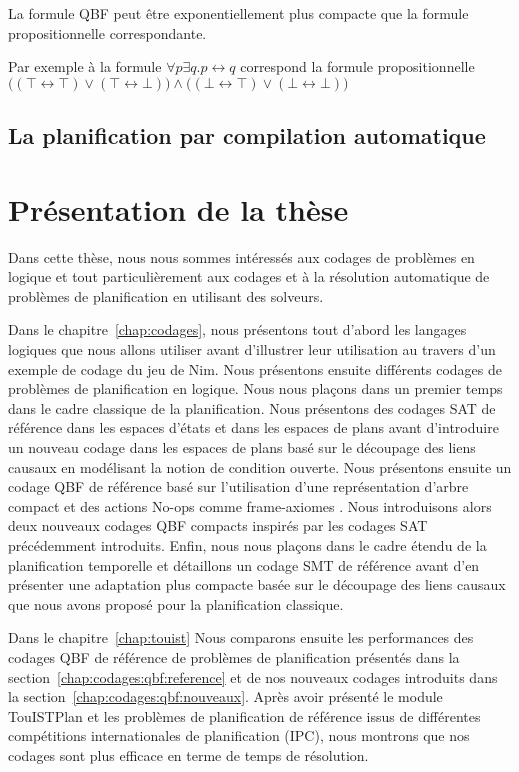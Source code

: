 La formule QBF peut être exponentiellement plus compacte que la formule propositionnelle correspondante. 

Par exemple à la formule $\forall p \exists q.p \leftrightarrow q$ correspond la formule propositionnelle \\
$\Big ( (\top \leftrightarrow \top)\vee (\top \leftrightarrow \bot) \Big ) \wedge \Big ( (\bot \leftrightarrow \top)\vee (\bot \leftrightarrow \bot) \Big )$

\subsection{La planification par compilation automatique}


\section{Présentation de la thèse}

Dans cette thèse, nous nous sommes intéressés aux codages de problèmes en logique et tout particulièrement aux codages et à la résolution automatique de problèmes de planification en utilisant des solveurs.

Dans le chapitre~\ref{chap:codages}, nous présentons tout d'abord les langages logiques que nous allons utiliser avant d'illustrer leur utilisation au travers d'un exemple de codage du jeu de Nim. Nous présentons ensuite différents codages de problèmes de planification en logique. Nous nous plaçons dans un premier temps dans le cadre classique de la planification. Nous présentons des codages SAT de référence dans les espaces d'états \cite{KS92,KS95} et dans les espaces de plans \cite{MK99} avant d'introduire un nouveau codage dans les espaces de plans basé sur le découpage des liens causaux en modélisant la notion de condition ouverte. Nous présentons ensuite un codage QBF de référence basé sur l'utilisation d'une représentation d'arbre compact et des actions No-ops comme frame-axiomes \cite{DBLP:conf/ecai/CashmoreFG12,DBLP:phd/ethos/Cashmore13}. Nous introduisons alors deux nouveaux codages QBF compacts inspirés par les codages SAT précédemment introduits. Enfin, nous nous plaçons dans le cadre étendu de la planification temporelle et détaillons un codage SMT de référence \cite{MarisRegnier08} avant d'en présenter une adaptation plus compacte basée sur le découpage des liens causaux que nous avons proposé pour la planification classique.

Dans le chapitre~\ref{chap:touist} 
Nous comparons ensuite les performances des codages QBF de référence de problèmes de planification présentés dans la section~\ref{chap:codages:qbf:reference} et de nos nouveaux codages introduits dans la section~\ref{chap:codages:qbf:nouveaux}. Après avoir présenté le module TouISTPlan et les problèmes de planification de référence issus de différentes compétitions internationales de planification (IPC), nous montrons que nos codages sont plus efficace en terme de temps de résolution.